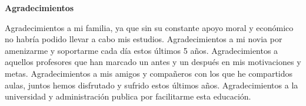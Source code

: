 \thispagestyle{empty}

\begin{flushleft}
	\textbf{\LARGE Agradecimientos}\\
\end{flushleft}

\vspace{1cm}

\begin{flushleft}
	Agradecimientos a mi familia, ya que sin su constante apoyo moral y económico no habría podido llevar a cabo mis estudios.
	Agradecimientos a mi novia por amenizarme  y soportarme cada día estos últimos 5 años.
	Agradecimientos a aquellos profesores que han marcado un antes y un después en mis motivaciones y metas.
	Agradecimientos a mis amigos y compañeros con los que he compartidos aulas, juntos hemos disfrutado y sufrido estos últimos años. 
	Agradecimientos a la universidad y administración publica por facilitarme esta educación.
\end{flushleft}

\newpage %
